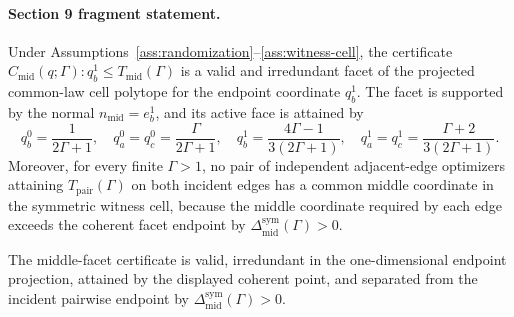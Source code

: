 \paragraph{Section 9 fragment statement.}
\begin{proposition}\label{prop:middle-facet}
Under Assumptions~\ref{ass:randomization}--\ref{ass:witness-cell}, the certificate \(C_{\mathrm{mid}}(q;\Gamma):q_b^1\le T_{\mathrm{mid}}(\Gamma)\) is a valid and irredundant facet of the projected common-law cell polytope for the endpoint coordinate \(q_b^1\).  The facet is supported by the normal \(n_{\mathrm{mid}}=e_b^1\), and its active face is attained by
\[
  q_b^0=\frac{1}{2\Gamma+1},\quad
  q_a^0=q_c^0=\frac{\Gamma}{2\Gamma+1},\quad
  q_b^1=\frac{4\Gamma-1}{3(2\Gamma+1)},\quad
  q_a^1=q_c^1=\frac{\Gamma+2}{3(2\Gamma+1)}.
\]
Moreover, for every finite \(\Gamma>1\), no pair of independent adjacent-edge optimizers attaining \(T_{\mathrm{pair}}(\Gamma)\) on both incident edges has a common middle coordinate in the symmetric witness cell, because the middle coordinate required by each edge exceeds the coherent facet endpoint by \(\Delta_{\mathrm{mid}}^{\mathrm{sym}}(\Gamma)>0\).

The middle-facet certificate is valid, irredundant in the one-dimensional endpoint projection, attained by the displayed coherent point, and separated from the incident pairwise endpoint by \(\Delta_{\mathrm{mid}}^{\mathrm{sym}}(\Gamma)>0\).
\end{proposition}


